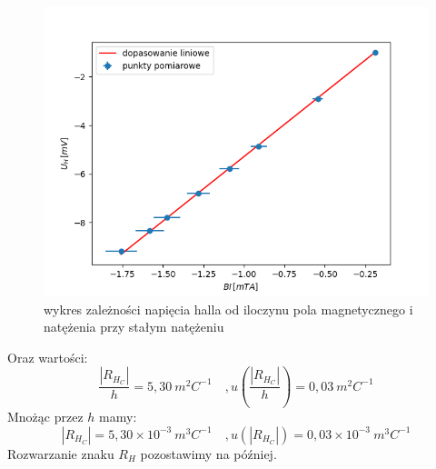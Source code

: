 \documentclass[12pt]{article}
\begin{document}
\begin{figure}[H]
    \centering
    \includegraphics[scale=0.5]{const_current}
    \caption{wykres zależności napięcia halla od iloczynu pola magnetycznego i natężenia przy stałym natężeniu}
    \label{fig:const_current_measuremnts}
\end{figure}
Oraz wartości:
\[
    \frac{|R_{H_C}|}{h} = 5{,}30 \ m^2C^{-1} \quad, u(\frac{|R_{H_C}|}{h}) = 0{,}03 \ m^2C^{-1}  
\]
Mnożąc przez $h$ mamy:
\begin{equation}
    |R_{H_C}| = 5{,}30\times 10^{-3} \ m^3C^{-1} \quad, u(|R_{H_C}|) = 0{,}03\times 10^{-3} \ m^3C^{-1}  
    \label{eq:hall_constant_current}
\end{equation}
Rozwarzanie znaku $R_H$ pozostawimy na później.
\end{document}
